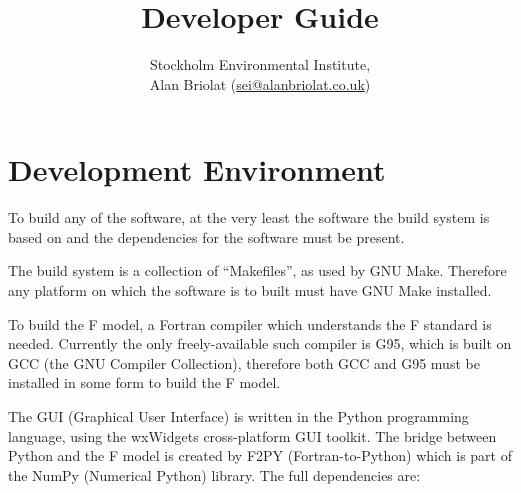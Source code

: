 \documentclass[10pt,a4paper]{article}
\title{\DOSE{} Developer Guide}
\author{Stockholm Environmental Institute,\\
Alan Briolat (\href{mailto:sei@alanbriolat.co.uk}{sei@alanbriolat.co.uk})}
\begin{document}
\maketitle

\newpage

\tableofcontents

\newpage








\section{Development Environment}
\label{dev:env}

To build any of the software, at the very least the software the build system is based on and the 
dependencies for the software must be present.

The build system is a collection of ``Makefiles'', as used by GNU Make.  Therefore any platform on 
which the software is to built must have GNU Make installed.

To build the F model, a Fortran compiler which understands the F standard is needed.  Currently the 
only freely-available such compiler is G95, which is built on GCC (the GNU Compiler Collection), 
therefore both GCC and G95 must be installed in some form to build the F model.

The GUI (Graphical User Interface) is written in the Python programming language, using the 
wxWidgets cross-platform GUI toolkit.  The bridge between Python and the F model is created by F2PY 
(Fortran-to-Python) which is part of the NumPy (Numerical Python) library.  The full dependencies 
are:
\end{document}
